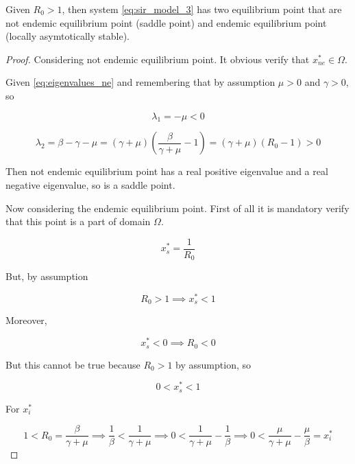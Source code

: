 \begin{theorem}
\label{th:R0_major_then_1_Equilibria}
Given $R_0 > 1$, then system \ref{eq:sir_model_3} has two equilibrium point that are not endemic equilibrium point (saddle point) and endemic equilibrium point (locally asymtotically stable).
\end{theorem}

\begin{proof}
Considering not endemic equilibrium point. It obvious verify that $x_{ne}^* \in \Omega$.

Given \ref{eq:eigenvalues_ne} and remembering that by assumption $\mu > 0$ and $\gamma > 0$, so

\begin{equation}
    \lambda_1 = -\mu < 0
\end{equation}

\begin{equation}
    \lambda_2 = \beta - \gamma - \mu = (\gamma + \mu)\left(\frac{\beta}{\gamma + \mu} - 1\right) = (\gamma + \mu)(R_0 - 1) > 0
\end{equation}

Then not endemic equilibrium point has a real positive eigenvalue and a real negative eigenvalue, so is a saddle point.

Now considering the endemic equilibrium point. First of all it is mandatory verify that this point is a part of domain $\Omega$.

\begin{equation}
    x_s^* = \frac{1}{R_0}
\end{equation}

But, by assumption

\begin{equation}
    R_0 > 1 \implies x_s^* < 1
\end{equation}

Moreover, 

\begin{equation}
    x_s^* < 0 \implies R_0 < 0  
\end{equation}

But this cannot be true because $R_0 > 1$ by assumption, so

\begin{equation}
    0 < x_s^* < 1
\end{equation}

For $x_i^*$

\begin{equation}
    1 < R_0 = \frac{\beta}{\gamma + \mu} \implies \frac{1}{\beta} < \frac{1}{\gamma + \mu} \implies 0 < \frac{1}{\gamma + \mu} - \frac{1}{\beta} \implies 0 < \frac{\mu}{\gamma + \mu} - \frac{\mu}{\beta} = x_i^*
\end{equation}


\end{proof}
